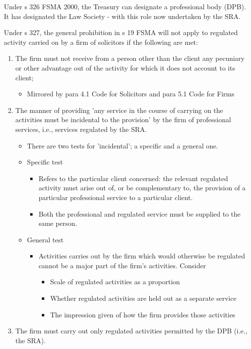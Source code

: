 \documentclass[
]{article}
\providecommand{\tightlist}{%
  \setlength{\itemsep}{0pt}\setlength{\parskip}{0pt}}
\begin{document}
Under s 326 FSMA 2000, the Treasury can designate a professional body
(DPB). It has designated the Law Society - with this role now undertaken
by the SRA.

Under s 327, the general prohibition in s 19 FSMA will not apply to
regulated activity carried on by a firm of solicitors if the following
are met:

\begin{enumerate}
\tightlist
\item
  The firm must not receive from a person other than the client any
  pecuniary or other advantage out of the activity for which it does not
  account to its client;

  \begin{itemize}
  \tightlist
  \item
    Mirrored by para 4.1 Code for Solicitors and para 5.1 Code for Firms
  \end{itemize}
\item
  The manner of providing 'any service in the course of carrying on the
  activities must be incidental to the provision' by the firm of
  professional services, i.e., services regulated by the SRA.

  \begin{itemize}
  \tightlist
  \item
    There are two tests for 'incidental'; a specific and a general one.
  \item
    Specific test

    \begin{itemize}
    \tightlist
    \item
      Refers to the particular client concerned: the relevant regulated
      activity must arise out of, or be complementary to, the provision
      of a particular professional service to a particular client.
    \item
      Both the professional and regulated service must be supplied to
      the same person.
    \end{itemize}
  \item
    General test

    \begin{itemize}
    \tightlist
    \item
      Activities carries out by the firm which would otherwise be
      regulated cannot be a major part of the firm's activities.
      Consider

      \begin{itemize}
      \tightlist
      \item
        Scale of regulated activities as a proportion
      \item
        Whether regulated activities are held out as a separate service
      \item
        The impression given of how the firm provides those activities
      \end{itemize}
    \end{itemize}
  \end{itemize}
\item
  The firm must carry out only regulated activities permitted by the DPB
  (i.e., the SRA).


\end{enumerate}
\end{document}

